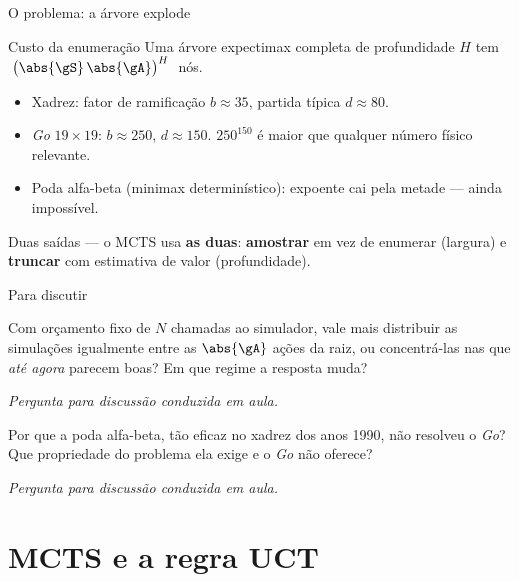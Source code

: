 \documentclass[aspectratio=169, 11pt]{beamer}
\newcommand{\paradiscussao}{\smallskip
  {\footnotesize\color{rlCinza}\itshape Pergunta para discussão conduzida em aula.}}
\begin{document}
\begin{frame}{O problema: a árvore explode}
  \begin{teobox}{Custo da enumeração}
    Uma árvore expectimax completa de profundidade $H$ tem
    $\;\bigl(\abs{\gS}\,\abs{\gA}\bigr)^{H}\;$ nós.
  \end{teobox}

  \pause
  \begin{itemize}
    \item Xadrez: fator de ramificação $b \approx 35$, partida típica $d \approx 80$.
    \item \emph{Go} $19\times19$: $b \approx 250$, $d \approx 150$. $250^{150}$ é maior que qualquer número físico relevante.
    \item Poda alfa-beta (minimax determinístico): expoente cai pela metade --- ainda impossível.
  \end{itemize}

  \pause
  \begin{ideiabox}
    Duas saídas --- o MCTS usa \textbf{as duas}: \textbf{amostrar} em vez de enumerar (largura) e \textbf{truncar} com estimativa de valor (profundidade).
  \end{ideiabox}
\end{frame}

\begin{frame}{Para discutir}
  \begin{quizbox}{}
    Com orçamento fixo de $N$ chamadas ao simulador, vale mais distribuir as
    simulações igualmente entre as $\abs{\gA}$ ações da raiz, ou concentrá-las
    nas que \emph{até agora} parecem boas? Em que regime a resposta muda?
  \end{quizbox}
  \paradiscussao

  \pause
  \vfill
  \begin{quizbox}{}
    Por que a poda alfa-beta, tão eficaz no xadrez dos anos 1990, não resolveu
    o \emph{Go}? Que propriedade do problema ela exige e o \emph{Go} não oferece?
  \end{quizbox}
  \paradiscussao
\end{frame}

\section{MCTS e a regra UCT}
\end{document}

